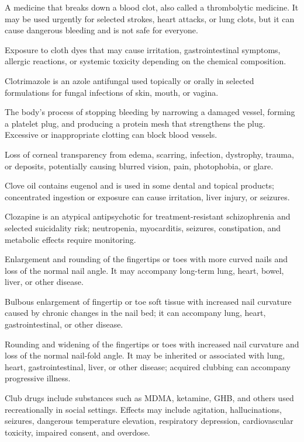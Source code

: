  A medicine that breaks down a blood clot, also called a thrombolytic medicine. It may be used urgently for selected strokes, heart attacks, or lung clots, but it can cause dangerous bleeding and is not safe for everyone.

 Exposure to cloth dyes that may cause irritation, gastrointestinal symptoms, allergic reactions, or systemic toxicity depending on the chemical composition.

 Clotrimazole is an azole antifungal used topically or orally in selected formulations for fungal infections of skin, mouth, or vagina.

 The body's process of stopping bleeding by narrowing a damaged vessel, forming a platelet plug, and producing a protein mesh that strengthens the plug. Excessive or inappropriate clotting can block blood vessels.

 Loss of corneal transparency from edema, scarring, infection, dystrophy, trauma, or deposits, potentially causing blurred vision, pain, photophobia, or glare.

 Clove oil contains eugenol and is used in some dental and topical products; concentrated ingestion or exposure can cause irritation, liver injury, or seizures.

 Clozapine is an atypical antipsychotic for treatment-resistant schizophrenia and selected suicidality risk; neutropenia, myocarditis, seizures, constipation, and metabolic effects require monitoring.

 Enlargement and rounding of the fingertips or toes with more curved nails and loss of the normal nail angle. It may accompany long-term lung, heart, bowel, liver, or other disease.

 Bulbous enlargement of fingertip or toe soft tissue with increased nail curvature caused by chronic changes in the nail bed; it can accompany lung, heart, gastrointestinal, or other disease.

 Rounding and widening of the fingertips or toes with increased nail curvature and loss of the normal nail-fold angle. It may be inherited or associated with lung, heart, gastrointestinal, liver, or other disease; acquired clubbing can accompany progressive illness.

 Club drugs include substances such as MDMA, ketamine, GHB, and others used recreationally in social settings. Effects may include agitation, hallucinations, seizures, dangerous temperature elevation, respiratory depression, cardiovascular toxicity, impaired consent, and overdose.

